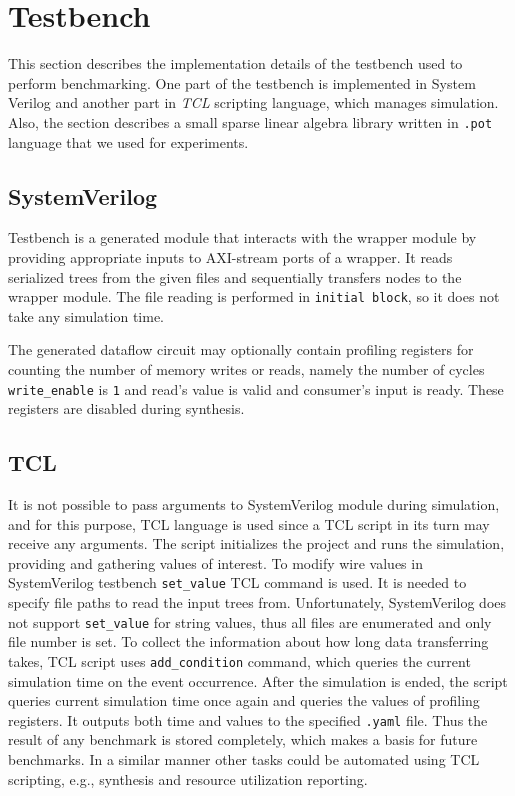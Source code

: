 \section{Testbench}

This section describes the implementation details of the testbench used to perform benchmarking. One part of the testbench is implemented in System Verilog and another part in \textit{TCL} scripting language, which manages simulation. Also, the section describes a small sparse linear algebra library written in \texttt{.pot} language that we used for experiments.

\subsection{SystemVerilog}

Testbench is a generated module that interacts with the wrapper module by providing appropriate inputs to AXI-stream ports of a wrapper. It reads serialized trees from the given files and sequentially transfers nodes to the wrapper module. The file reading is performed in \texttt{initial block}, so it does not take any simulation time.

The generated dataflow circuit may optionally contain profiling registers for counting the number of memory writes or reads, namely the number of cycles \texttt{write\_enable} is \texttt{1} and read's value is valid and consumer's input is ready. These registers are disabled during synthesis.

\subsection{TCL}

It is not possible to pass arguments to SystemVerilog module during simulation, and for this purpose, TCL language is used since a TCL script in its turn may receive any arguments. The script initializes the project and runs the simulation, providing and gathering values of interest. To modify wire values in SystemVerilog testbench \texttt{set\_value} TCL command is used. It is needed to specify file paths to read the input trees from. Unfortunately, SystemVerilog does not support \texttt{set\_value} for string values, thus all files are enumerated and only file number is set. To collect the information about how long data transferring takes, TCL script uses \texttt{add\_condition} command, which queries the current simulation time on the event occurrence. After the simulation is ended, the script queries current simulation time once again and queries the values of profiling registers. It outputs both time and values to the specified \texttt{.yaml} file. Thus the result of any benchmark is stored completely, which makes a basis for future benchmarks. In a similar manner other tasks could be automated using TCL scripting, e.g., synthesis and resource utilization reporting.



